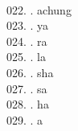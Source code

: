 \begin{tabbing}
\egroup  \\
022.	. 	\> achung	\> \bgroup\tibetan \def\u#1{\vtop{\baselineskip0pt\hbox{#1}\hbox{\tibsp\char123}}}\parindent=0pt \newbox\fillerbox\setbox\fillerbox\hbox{\vrule height0.4cm depth0.4cm width0pt}\def\filler{\copy\fillerbox}\filler\tibsp{}\tenrm\ \tibetan
\egroup  \\
023.	. 	\> ya 	\> \bgroup\tibetan \def\u#1{\vtop{\baselineskip0pt\hbox{#1}\hbox{\tibsp\char123}}}\parindent=0pt \newbox\fillerbox\setbox\fillerbox\hbox{\vrule height0.4cm depth0.4cm width0pt}\def\filler{\copy\fillerbox}\filler\tibsp{}\tenrm\ \tibetan
\egroup  \\
024.	. 	\> ra 	\> \bgroup\tibetan \def\u#1{\vtop{\baselineskip0pt\hbox{#1}\hbox{\tibsp\char123}}}\parindent=0pt \newbox\fillerbox\setbox\fillerbox\hbox{\vrule height0.4cm depth0.4cm width0pt}\def\filler{\copy\fillerbox}\filler\tibsp{}\tenrm\ \tibetan
\egroup  \\
025.	. 	\> la 	\> \bgroup\tibetan \def\u#1{\vtop{\baselineskip0pt\hbox{#1}\hbox{\tibsp\char123}}}\parindent=0pt \newbox\fillerbox\setbox\fillerbox\hbox{\vrule height0.4cm depth0.4cm width0pt}\def\filler{\copy\fillerbox}\filler\tibsp{}\tenrm\ \tibetan
\egroup  \\
026.	. 	\> sha 	\> \bgroup\tibetan \def\u#1{\vtop{\baselineskip0pt\hbox{#1}\hbox{\tibsp\char123}}}\parindent=0pt \newbox\fillerbox\setbox\fillerbox\hbox{\vrule height0.4cm depth0.4cm width0pt}\def\filler{\copy\fillerbox}\filler\tibsp{}\tenrm\ \tibetan
\egroup  \\
027.	. 	\> sa 	\> \bgroup\tibetan \def\u#1{\vtop{\baselineskip0pt\hbox{#1}\hbox{\tibsp\char123}}}\parindent=0pt \newbox\fillerbox\setbox\fillerbox\hbox{\vrule height0.4cm depth0.4cm width0pt}\def\filler{\copy\fillerbox}\filler\tibsp{}\tenrm\ \tibetan
\egroup  \\
028.	. 	\> ha 	\> \bgroup\tibetan \def\u#1{\vtop{\baselineskip0pt\hbox{#1}\hbox{\tibsp\char123}}}\parindent=0pt \newbox\fillerbox\setbox\fillerbox\hbox{\vrule height0.4cm depth0.4cm width0pt}\def\filler{\copy\fillerbox}\filler\tibsp{}\tenrm\ \tibetan
\egroup  \\
029.	. 	\> a 	\> \bgroup\tibetan \def\u#1{\vtop{\baselineskip0pt\hbox{#1}\hbox{\tibsp\char123}}}\parindent=0pt \newbox\fillerbox\setbox\fillerbox\hbox{\vrule height0.4cm depth0.4cm width0pt}\def\filler{\copy\fillerbox}\filler\tibsp{}\tenrm\ \tibetan

\end{tabbing}
